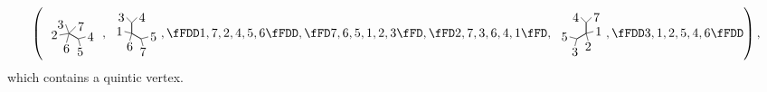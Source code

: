 \documentclass[pdftex]{sigma}
\theoremstyle{definition}
\numberwithin{equation}{section}
\begin{document}
\begin{align*}
\left(
	{
 \raisebox{-.65 cm}{
\tikz[scale=.3]{
\draw[]
(0,0)--(90:0)--++(90+45-25:.9) node[left=-2pt]{3}
(0,0)--(90:0)--++(90-45:.9) node[right=-2pt]{7}
(0,0)--(90-120:1)--++(90-120+45:.7) node[right=-2pt]{4}
(0,0)--(90-120:1)--++(90-120-45:.7) node[below=-2pt]{5}
(0,0)--(90+120:0)--++(90+120+45:.9) node[below=-2pt]{6}
(0,0)--(90+120:0)--++(90+120-45+25:.9) node[left=-2pt]{2}
;
}
}},
 {
 \raisebox{-.65 cm}{
\tikz[scale=.3]{
\draw[]
(0,0)--(90:1)--++(90+45:.7) node[left=-2pt]{3}
(0,0)--(90:1)--++(90-45:.7) node[right=-2pt]{4}
(0,0)--(90-120:1)--++(90-120+45:.7) node[right=-2pt]{5}
(0,0)--(90-120:1)--++(90-120-45:.7) node[below=-2pt]{7}
(0,0)--(90+120:0)--++(90+120+45:.7) node[below=-2pt]{6}
(0,0)--(90+120:0)--++(90+120-45:.7) node[left=-2pt]{1}
;
}}},
 \fFDD 1, 7, 2, 4, 5, 6 \fFDD,
 \fFD 7, 6, 5, 1, 2, 3 \fFD,
 \fFD 2, 7, 3, 6, 4, 1 \fFD,
 {
 \raisebox{-.65 cm}{
\tikz[scale=.3]{
\draw[]
(0,0)--(90:1)--++(90+45:.7) node[left=-2pt]{4}
(0,0)--(90:1)--++(90-45:.7) node[right=-2pt]{7}
(0,0)--(90-120:0)--++(90-120+45:.7) node[right=-2pt]{1}
(0,0)--(90-120:0)--++(90-120-45:.7) node[below=-2pt]{2}
(0,0)--(90+120:1)--++(90+120+45:.7) node[below=-2pt]{3}
(0,0)--(90+120:1)--++(90+120-45:.7) node[left=-2pt]{5}
;
}}},
%
 \fFDD 3, 1, 2, 5, 4, 6 \fFDD
\right) ,
\end{align*}
%
which contains a quintic vertex.
\end{document}
